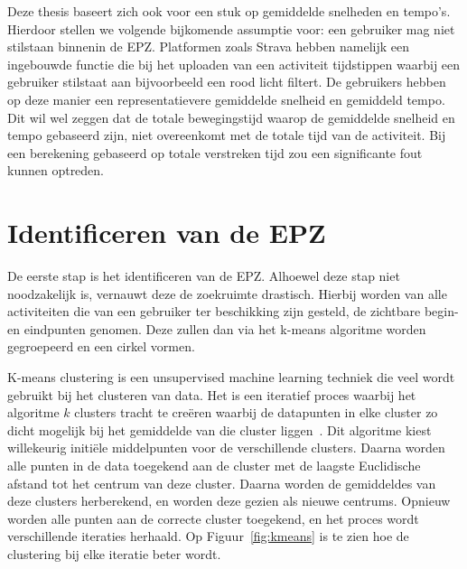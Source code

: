 Deze thesis baseert zich ook voor een stuk op gemiddelde snelheden en tempo's.
Hierdoor stellen we volgende bijkomende assumptie voor: een gebruiker mag niet
stilstaan binnenin de \ac{EPZ}. Platformen zoals Strava hebben namelijk een
ingebouwde functie die bij het uploaden van een activiteit tijdstippen waarbij
een gebruiker stilstaat aan bijvoorbeeld een rood licht filtert. De gebruikers
hebben op deze manier een representatievere gemiddelde snelheid en gemiddeld
tempo. Dit wil wel zeggen dat de totale bewegingstijd waarop de gemiddelde
snelheid en tempo gebaseerd zijn, niet overeenkomt met de totale tijd van de
activiteit. Bij een berekening gebaseerd op totale verstreken tijd zou een
significante fout kunnen optreden.

\section{Identificeren van de EPZ}
De eerste stap is het identificeren van de \ac{EPZ}. Alhoewel deze stap niet
noodzakelijk is, vernauwt deze de zoekruimte drastisch. Hierbij worden van alle
activiteiten die van een gebruiker ter beschikking zijn gesteld, de zichtbare
begin- en eindpunten genomen. Deze zullen dan via het k-means algoritme worden
gegroepeerd en een cirkel vormen.

K-means clustering is een unsupervised machine learning techniek die veel wordt
gebruikt bij het clusteren van data. Het is een iteratief proces waarbij het
algoritme $k$ clusters tracht te creëren waarbij de datapunten in elke cluster
zo dicht mogelijk bij het gemiddelde van die cluster
liggen~\cite{Understa24:online}. Dit algoritme kiest willekeurig initiële
middelpunten voor de verschillende clusters. Daarna worden alle punten in de
data toegekend aan de cluster met de laagste Euclidische afstand tot het
centrum van deze cluster. Daarna worden de gemiddeldes van deze clusters
herberekend, en worden deze gezien als nieuwe centrums. Opnieuw worden alle
punten aan de correcte cluster toegekend, en het proces wordt verschillende
iteraties herhaald. Op Figuur~\ref{fig:kmeans} is te zien hoe de clustering bij
elke iteratie beter wordt.

